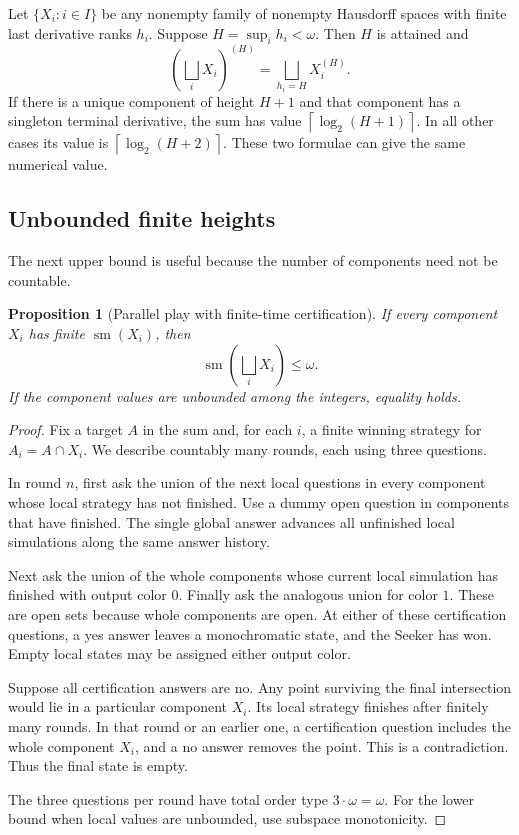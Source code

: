 \documentclass[11pt,letterpaper]{article}
\numberwithin{equation}{section}
\newtheorem{proposition}[proposition]{Proposition}
\theoremstyle{definition}
\theoremstyle{remark}
\theoremstyle{definition}
\newcommand{\sm}{\operatorname{sm}}
\newcommand{\ceil}[1]{\left\lceil#1\right\rceil}
\newcommand{\bigsqsum}{\bigsqcup}
\begin{document}
Let $\{X_i:i\in I\}$ be any nonempty family of nonempty Hausdorff spaces with
finite last derivative ranks $h_i$. Suppose $H=\sup_i h_i<\omega$. Then $H$
is attained and
\[
 \left(\bigsqsum_iX_i\right)^{(H)}
 =\bigsqsum_{h_i=H}X_i^{(H)}.
\]
If there is a unique component of height $H+1$ and that component has a
singleton terminal derivative, the sum has value $\ceil{\log_2(H+1)}$.
In all other cases its value is $\ceil{\log_2(H+2)}$.
These two formulae can give the same numerical value.

\subsection{Unbounded finite heights}

The next upper bound is useful because the number of components need not be
countable.

\begin{proposition}[Parallel play with finite-time certification]\label{prop:omega-sum}
If every component $X_i$ has finite $\sm(X_i)$, then
\[
 \sm\!\left(\bigsqsum_iX_i\right)\leq\omega.
\]
If the component values are unbounded among the integers, equality holds.
\end{proposition}
\begin{proof}
Fix a target $A$ in the sum and, for each $i$, a finite winning strategy for
$A_i=A\cap X_i$. We describe countably many rounds, each using three questions.

In round $n$, first ask the union of the next local questions in every component
whose local strategy has not finished. Use a dummy open question in components
that have finished. The single global answer advances all unfinished local
simulations along the same answer history.

Next ask the union of the whole components whose current local simulation has
finished with output color $0$. Finally ask the analogous union for color $1$.
These are open sets because whole components are open. At either of these
certification questions, a yes answer leaves a monochromatic state, and the
Seeker has won. Empty local states may be assigned either output color.

Suppose all certification answers are no. Any point surviving the final
intersection would lie in a particular component $X_i$. Its local strategy
finishes after finitely many rounds. In that round or an earlier one, a
certification question includes the whole component $X_i$, and a no answer
removes the point. This is a contradiction. Thus the final state is empty.

The three questions per round have total order type $3\cdot\omega=\omega$.
For the lower bound when local values are unbounded, use subspace monotonicity.
\end{proof}
\end{document}
